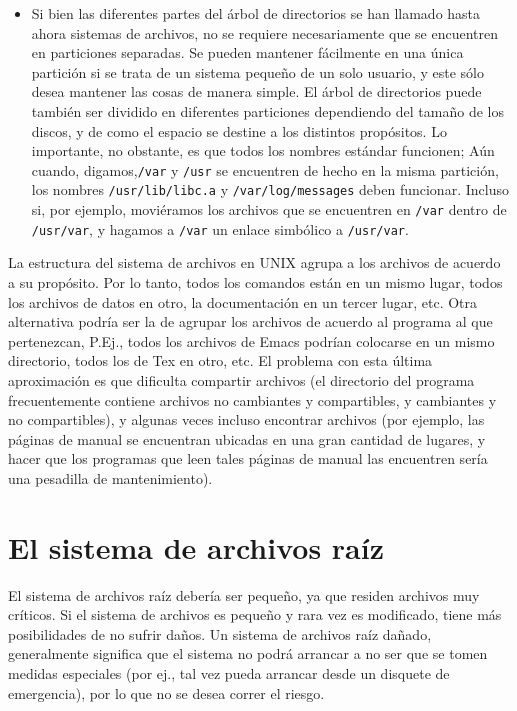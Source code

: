 \begin{itemize}
\item{ Si bien las diferentes partes del árbol de directorios se han
llamado hasta ahora sistemas de archivos, no se requiere necesariamente que se
encuentren en particiones separadas. Se pueden mantener fácilmente en una única
partición si se trata de un sistema pequeño de un solo usuario, y este sólo
desea mantener las cosas de manera simple. El árbol de directorios puede también
ser dividido en  diferentes particiones dependiendo del tamaño de los discos, y
de como el espacio se destine a los distintos propósitos. Lo importante, no
obstante, es que todos los nombres estándar funcionen; Aún cuando,
digamos,\texttt{/var} y \texttt{/usr} se encuentren de
hecho en la misma partición, los nombres \texttt{/usr/lib/libc.a} y
\texttt{/var/log/messages} deben funcionar. Incluso si, por ejemplo,
moviéramos los archivos que se encuentren en \texttt{/var} dentro de
\texttt{/usr/var}, y hagamos a \texttt{/var} un enlace
simbólico a \texttt{/usr/var}.  } \end{itemize}

 La estructura del sistema de archivos en UNIX agrupa a los archivos de
acuerdo a su propósito. Por lo tanto, todos los comandos están en un mismo
lugar, todos los archivos de datos en otro, la documentación en un tercer lugar,
etc.  Otra alternativa podría ser la de agrupar los archivos de acuerdo al
programa al que pertenezcan, P.Ej., todos los archivos de Emacs podrían
colocarse en un mismo directorio, todos los de Tex en otro, etc. El problema con
esta última aproximación es que dificulta compartir archivos (el directorio del
programa frecuentemente contiene archivos no cambiantes y compartibles, y
cambiantes y no compartibles), y algunas veces incluso encontrar archivos (por
ejemplo, las páginas de manual se encuentran ubicadas en una gran cantidad de
lugares, y hacer que los programas que leen tales páginas de manual las
encuentren sería una pesadilla de mantenimiento).  




\section{ El sistema de archivos raíz}

 El sistema de archivos raíz debería ser pequeño, ya que residen archivos
muy críticos. Si el sistema de archivos es pequeño y rara vez es modificado,
tiene más posibilidades de no sufrir daños. Un sistema de archivos raíz dañado,
generalmente significa que el sistema no podrá arrancar a no ser que se tomen
medidas especiales (por ej., tal vez pueda arrancar desde un disquete de
emergencia), por lo que no se desea correr el riesgo.  

